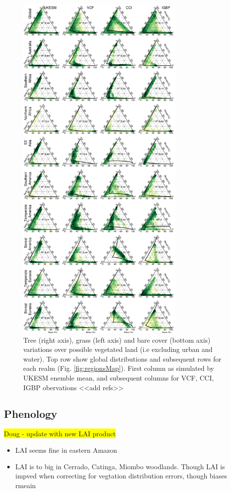 \documentclass[bg, manuscript]{copernicus}
\newcommand{\hilight}[1]{\colorbox{yellow}{#1}}
\begin{document}
\begin{figure}[t]
\includegraphics[width=8.3cm]{figs/VegDist/VegDistTriangle.png}
\caption{Tree (right axis), grass (left axis) and bare cover (bottom axis) variations over possible vegetated land (i.e excluding urban and water). Top row show global distributions and subsequent rows for each realm (Fig. \ref{fig:regionsMap}). First column as simulated by UKESM enemble mean, and subsequent columns for VCF, CCI, IGBP obervations <<add refs>> \label{fig:VegDistTri}}
\end{figure}

\subsection{Phenology}

\hilight{Doug - update with new LAI product}

\begin{itemize}
    \item LAI seems fine in eastern Amazon
    \item LAI is to big in Cerrado, Catinga, Miombo woodlands. Though LAI is impved  when correcting for vegtation distribution errors, though biases rmeain
\end{itemize}
\end{document}
